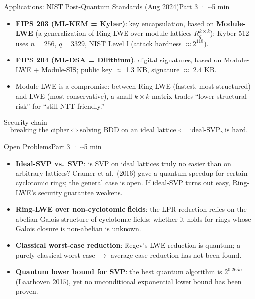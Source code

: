 \documentclass[aspectratio=169, 11pt]{beamer}
\begin{document}
\begin{frame}{Applications: NIST Post-Quantum Standards (Aug 2024)}{Part 3 · \textasciitilde 5 min}
  \begin{itemize}\small
    \item \textbf{FIPS 203 (ML-KEM = Kyber)}: key encapsulation, based on \textbf{Module-LWE}
      (a generalization of Ring-LWE over module lattices $R_q^{k\times k}$);
      Kyber-512 uses $n=256$, $q=3329$, NIST Level I (attack hardness $\approx2^{118}$).
    \item \textbf{FIPS 204 (ML-DSA = Dilithium)}: digital signatures, based on Module-LWE $+$ Module-SIS;
      public key $\approx$ 1.3 KB, signature $\approx$ 2.4 KB.
    \item Module-LWE is a compromise: between Ring-LWE (fastest, most structured) and LWE (most conservative),
      a small $k\times k$ matrix trades ``lower structural risk'' for ``still NTT-friendly.''
  \end{itemize}
  \begin{block}{Security chain}
    \[
      \text{breaking the cipher} \iff \text{solving BDD on an ideal lattice} \impliedby \text{ideal-SVP}_\gamma\ \text{is hard}.
    \]
  \end{block}
\end{frame}

\begin{frame}{Open Problems}{Part 3 · \textasciitilde 5 min}
  \begin{itemize}\small
    \item \textbf{Ideal-SVP vs.\ SVP}: is SVP on ideal lattices truly no easier than on arbitrary lattices?
      Cramer et al.\ (2016) gave a quantum speedup for certain cyclotomic rings; the general case is open.
      If ideal-SVP turns out easy, Ring-LWE's security guarantee weakens.
    \item \textbf{Ring-LWE over non-cyclotomic fields}: the LPR reduction relies on the abelian Galois structure of cyclotomic fields;
      whether it holds for rings whose Galois closure is non-abelian is unknown.
    \item \textbf{Classical worst-case reduction}: Regev's LWE reduction is quantum;
      a purely classical worst-case $\to$ average-case reduction has not been found.
    \item \textbf{Quantum lower bound for SVP}: the best quantum algorithm is $2^{0.265n}$ (Laarhoven 2015),
      yet no unconditional exponential lower bound has been proven.
  \end{itemize}
\end{frame}
\end{document}
